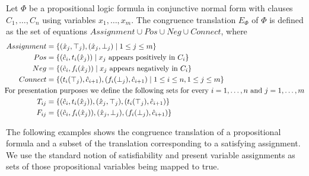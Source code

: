 \begin{definition}

Let $\Phi$ be a propositional logic formula in conjunctive normal form with clauses $C_1,\ldots,C_n$ using variables $x_1,\ldots,x_m$.
The congruence translation $E_{\Phi}$ of $\Phi$ is defined as the set of equations $Assignment \cup Pos \cup Neg \cup Connect$, where
\begin{align*}
	Assignment &= \{ (\hat{x}_j,\top_j), (\hat{x}_j,\bot_j) \mid 1 \leq j \leq m\} \\
	Pos &= \{ (\hat{c}_i, t_i(\hat{x}_j)) \mid x_j \text{ appears positively in } C_i\} \\
	Neg &= \{ (\hat{c}_i, f_i(\hat{x}_j)) \mid x_j \text{ appears negatively in } C_i\} \\
	Connect &= \{ (t_i(\top_j),\hat{c}_{i+1}),(f_i(\bot_j), \hat{c}_{i+1}) \mid 1 \leq i \leq n, 1 \leq j \leq m\} \\
&\hspace{-2cm}\text{For presentation purposes we define the following sets for every $i = 1,\ldots, n$ and $j = 1,\ldots, m$}\\
T_{ij} &= \{(\hat{c}_i, t_i(\hat{x}_j)), (\hat{x}_j,\top_j), (t_i(\top_j),\hat{c}_{i+1})\} \\
F_{ij} &= \{(\hat{c}_i, f_i(\hat{x}_j)), (\hat{x}_j,\bot_j), (f_i(\bot_j),\hat{c}_{i+1})\}
\end{align*}

\end{definition}

The following examples shows the congruence translation of a propositional formula and a subset of the translation corresponding to a satisfying assignment.
We use the standard notion of satisfiability and present variable assignments as sets of those propositional variables being mapped to true.

